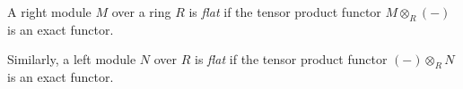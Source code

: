 \documentclass[12pt]{article}
\begin{document}
A right module $M$ over a ring $R$ is {\it flat}
if the tensor product functor $M \otimes_R (-)$ 
is an exact functor.

Similarly, a left module $N$ over $R$ is {\it flat}
if the tensor product functor $(-) \otimes_R N$ 
is an exact functor.
\end{document}
